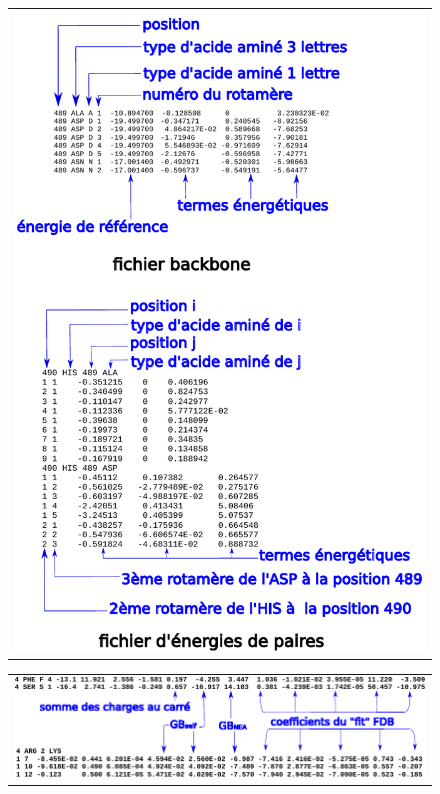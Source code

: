    \begin{figure}[!htbp]
     \centering
     \begin{tabular}{c}
       \includegraphics[width=12cm]{figure/inputener.pdf} 
     \end{tabular}     
     \caption{}
\label{fig:CAenerfile}
   \end{figure}

   \begin{figure}[!htbp]
     \centering
     \begin{tabular}{c}
       \includegraphics[width=16cm]{figure/inputenerFDB.pdf} 
     \end{tabular}     
     \caption{}
\label{fig:GBenerfile}
   \end{figure} 
   
